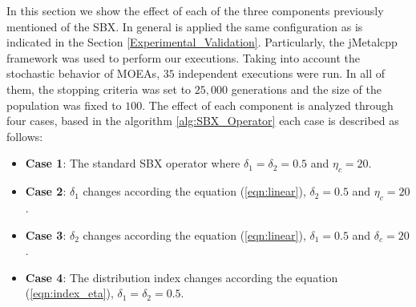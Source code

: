 In this section we show the effect of each of the three components previously mentioned of the SBX.
%
In general is applied the same configuration as is indicated in the Section \ref{Experimental_Validation}.
%
Particularly, the jMetalcpp \cite{Joel:jMetal} framework was used to perform our executions.
%
Taking into account the stochastic behavior of MOEAs, $35$ independent executions were run.
%
In all of them, the stopping criteria was set to $25,000$ generations and the size of the population was fixed to $100$.
%
The effect of each component is analyzed through four cases, based in the algorithm \ref{alg:SBX_Operator} each case is described as follows:
\begin{itemize}
\item \textbf{Case 1}: The standard SBX operator where $\delta_1 = \delta_2 = 0.5$ and $\eta_c = 20$.
\item \textbf{Case 2}: $\delta_1$ changes according the equation (\ref{eqn:linear}),  $\delta_2=0.5$ and $\eta_c = 20$.
\item \textbf{Case 3}: $\delta_2$ changes according the equation (\ref{eqn:linear}), $\delta_1=0.5$ and $\delta_c = 20$.
\item \textbf{Case 4}: The distribution index changes according the equation (\ref{eqn:index_eta}), $\delta_1=\delta_2=0.5$.
\end{itemize}


